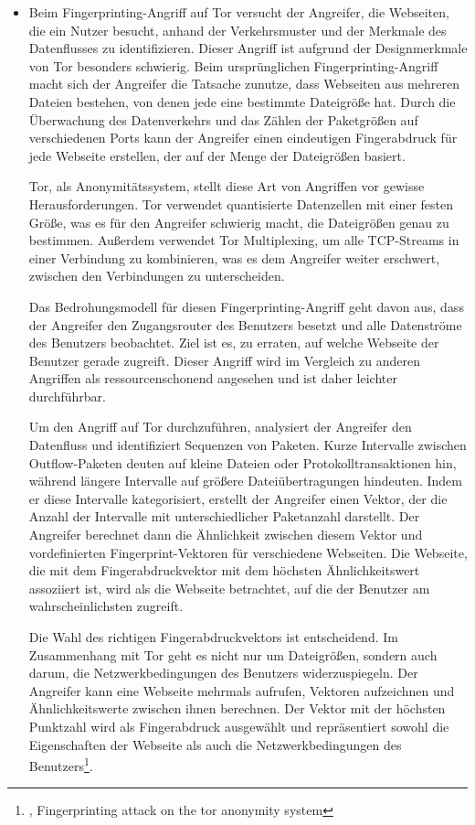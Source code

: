 \begin{itemize}
    \item Beim Fingerprinting-Angriff auf Tor versucht der Angreifer, die Webseiten, die ein Nutzer besucht, anhand der Verkehrsmuster und der Merkmale des Datenflusses zu identifizieren. Dieser Angriff ist aufgrund der Designmerkmale von Tor besonders schwierig. Beim ursprünglichen Fingerprinting-Angriff macht sich der Angreifer die Tatsache zunutze, dass Webseiten aus mehreren Dateien bestehen, von denen jede eine bestimmte Dateigröße hat. Durch die Überwachung des Datenverkehrs und das Zählen der Paketgrößen auf verschiedenen Ports kann der Angreifer einen eindeutigen Fingerabdruck für jede Webseite erstellen, der auf der Menge der Dateigrößen basiert.

    Tor, als Anonymitätssystem, stellt diese Art von Angriffen vor gewisse Herausforderungen. Tor verwendet quantisierte Datenzellen mit einer festen Größe, was es für den Angreifer schwierig macht, die Dateigrößen genau zu bestimmen. Außerdem verwendet Tor Multiplexing, um alle TCP-Streams in einer Verbindung zu kombinieren, was es dem Angreifer weiter erschwert, zwischen den Verbindungen zu unterscheiden.

    Das Bedrohungsmodell für diesen Fingerprinting-Angriff geht davon aus, dass der Angreifer den Zugangsrouter des Benutzers besetzt und alle Datenströme des Benutzers beobachtet. Ziel ist es, zu erraten, auf welche Webseite der Benutzer gerade zugreift. Dieser Angriff wird im Vergleich zu anderen Angriffen als ressourcenschonend angesehen und ist daher leichter durchführbar.

    Um den Angriff auf Tor durchzuführen, analysiert der Angreifer den Datenfluss und identifiziert Sequenzen von Paketen. Kurze Intervalle zwischen Outflow-Paketen deuten auf kleine Dateien oder Protokolltransaktionen hin, während längere Intervalle auf größere Dateiübertragungen hindeuten. Indem er diese Intervalle kategorisiert, erstellt der Angreifer einen Vektor, der die Anzahl der Intervalle mit unterschiedlicher Paketanzahl darstellt. Der Angreifer berechnet dann die Ähnlichkeit zwischen diesem Vektor und vordefinierten Fingerprint-Vektoren für verschiedene Webseiten. Die Webseite, die mit dem Fingerabdruckvektor mit dem höchsten Ähnlichkeitswert assoziiert ist, wird als die Webseite betrachtet, auf die der Benutzer am wahrscheinlichsten zugreift.

    Die Wahl des richtigen Fingerabdruckvektors ist entscheidend. Im Zusammenhang mit Tor geht es nicht nur um Dateigrößen, sondern auch darum, die Netzwerkbedingungen des Benutzers widerzuspiegeln. Der Angreifer kann eine Webseite mehrmals aufrufen, Vektoren aufzeichnen und Ähnlichkeitswerte zwischen ihnen berechnen. Der Vektor mit der höchsten Punktzahl wird als Fingerabdruck ausgewählt und repräsentiert sowohl die Eigenschaften der Webseite als auch die Netzwerkbedingungen des Benutzers\footnote{\cite{FingerprintingOnTorAttack}, Fingerprinting attack on the tor anonymity system}.


\end{itemize}

